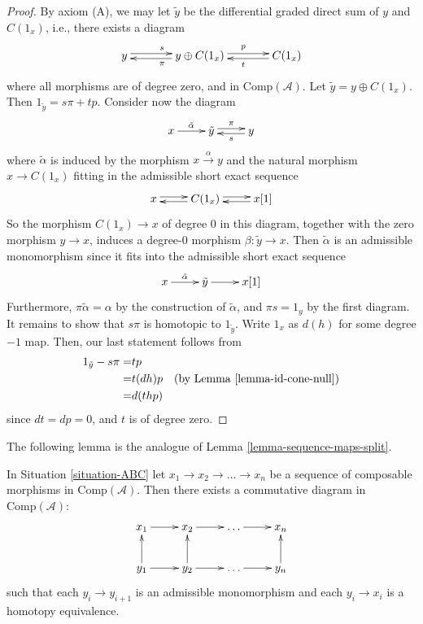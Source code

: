 \begin{proof}
By axiom (A), we may let $\tilde{y}$ be the differential graded direct
sum of $y$ and $C(1_x)$, i.e., there exists a diagram
$$
\xymatrix@C=3pc{
y \ar@<0.5ex>[r]^s  &
y\oplus C(1_x) \ar@<0.5ex>[l]^{\pi} \ar@<0.5ex>[r]^{p} &
C(1_x)\ar@<0.5ex>[l]^t
}
$$
where all morphisms are of degree zero, and in
$\text{Comp}(\mathcal{A})$. Let $\tilde{y} = y \oplus C(1_x)$.
Then $1_{\tilde{y}} = s\pi + tp$. Consider now the diagram
$$
\xymatrix{
x \ar[r]^{\tilde{\alpha}}  &
\tilde{y} \ar@<0.5ex>[r]^{\pi} &
y\ar@<0.5ex>[l]^s
}
$$
where $\tilde{\alpha}$ is induced by the morphism $x\xrightarrow{\alpha}y$
and the natural morphism $x\to C(1_x)$ fitting in the admissible
short exact sequence
$$
\xymatrix{
x \ar@<0.5ex>[r]  &
C(1_x) \ar@<0.5ex>[l] \ar@<0.5ex>[r] &
x[1]\ar@<0.5ex>[l]
}
$$
So the morphism $C(1_x)\to x$ of degree 0 in this diagram,
together with the zero morphism $y\to x$, induces a degree-0
morphism $\beta : \tilde{y} \to x$. Then $\tilde{\alpha}$ is an
admissible monomorphism since it fits into the admissible short
exact sequence
$$
\xymatrix{
x\ar[r]^{\tilde{\alpha}} &
\tilde{y} \ar[r] &
x[1]
}
$$
Furthermore, $\pi\tilde{\alpha} = \alpha$ by the construction of
$\tilde{\alpha}$, and $\pi s = 1_y$ by the first diagram. It
remains to show that $s\pi$ is homotopic to $1_{\tilde{y}}$.
Write $1_x$ as $d(h)$ for some degree $-1$ map. Then, our
last statement follows from
\begin{align*}
1_{\tilde{y}} - s\pi
= &
tp \\
= &
t(dh)p\quad\text{(by Lemma \ref{lemma-id-cone-null})} \\
= &
d(thp)
\end{align*}
since $dt = dp = 0$, and $t$ is of degree zero. 
\end{proof}

\noindent
The following lemma is the analogue of Lemma \ref{lemma-sequence-maps-split}.

\begin{lemma}
\label{lemma-analogue-sequence-maps-split}
In Situation \ref{situation-ABC}
let $x_1 \to x_2 \to \ldots \to x_n$
be a sequence of composable morphisms in $\text{Comp}(\mathcal{A})$.
Then there exists a commutative diagram in $\text{Comp}(\mathcal{A})$:
$$
\xymatrix{x_1\ar[r] & x_2\ar[r] & \ldots\ar[r] & x_n\\
y_1\ar[r]\ar[u] & y_2\ar[r]\ar[u] & \ldots\ar[r] & y_n\ar[u]}
$$
such that each $y_i\to y_{i+1}$ is an admissible monomorphism
and each $y_i\to x_i$ is a homotopy equivalence.
\end{lemma}

